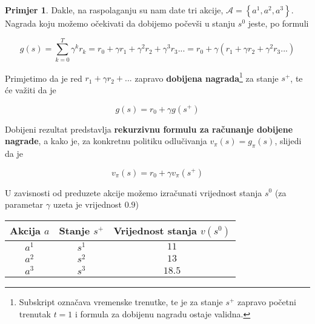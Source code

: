 \documentclass[12pt]{IEEEtran}
\numberwithin{equation}{subsection}
\numberwithin{figure}{subsection}
\theoremstyle{definition}
\newtheorem{example}{Primjer}
\numberwithin{example}{section}
\begin{document}
\begin{example}
    Dakle, na raspolaganju su nam date tri akcije, $\mathcal{A} = \left\{a^{1}, a^{2}, a^{3}\right\}$. Nagrada koju mo\v{z}emo
    o\v{c}ekivati da dobijemo po\v{c}ev\v{s}i u stanju $s^{0}$ jeste, po formuli

    \begin{equation}
        g(s) = \sum_{k = 0}^{T}{\gamma^{k}r_{k}} = r_{0} + \gamma r_{1} + \gamma^{2} r_{2} + \gamma^{3} r_{3} ... = r_{0} + \gamma (r_{1} + \gamma r_{2} + \gamma^{2} r_{3}...)
    \end{equation}

    Primjetimo da je red $r_1 + \gamma r_2 + ...$ zapravo \textbf{dobijena nagrada}\footnote{
        Subskript ozna\v{c}ava vremenske trenutke, te je za stanje $s^{+}$ zapravo po\v{c}etni 
        trenutak $t = 1$ i formula za dobijenu nagradu ostaje validna.}
    za stanje $s^{+}$, te \'{c}e va\v{z}iti da je

    \begin{equation}
        g(s) = r_{0} + \gamma g(s^{+})
    \end{equation}

    Dobijeni rezultat predstavlja \textbf{rekurzivnu formulu za ra\v{c}unanje dobijene nagrade}, a kako je, za konkretnu
    politiku odlu\v{c}ivanja $v_{\pi}(s) = g_{\pi}(s)$, slijedi da je

    \begin{equation}
        v_{\pi}(s) = r_{0} + \gamma v_{\pi}(s^{+})
    \end{equation}

    U zavisnosti od preduzete akcije mo\v{z}emo izra\v{c}unati
    vrijednost stanja $s^{0}$ (za parametar $\gamma$ uzeta je
    vrijednost $0.9$)

    \begin{table}[h]
        \normalsize
        \centering
        \begin{tabular}{*3c}
            \textbf{Akcija $a$} & \textbf{Stanje $s^{+}$} & \textbf{Vrijednost stanja $v(s^{0})$} \\
            \toprule
            $a^{1}$             & $s^{1}$                 & $11$                                  \\
            \hline
            $a^{2}$             & $s^{2}$                 & $13$                                  \\
            \hline
            $a^{3}$             & $s^{3}$                 & $18.5$                                \\
            \hline
        \end{tabular}
    \end{table}

\end{example}
\end{document}
